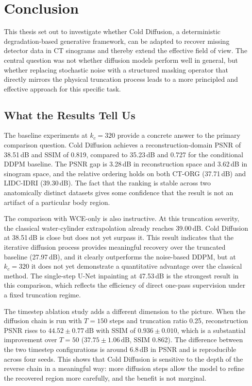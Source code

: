 \chapter{Conclusion}
\label{ch:conclusion}

This thesis set out to investigate whether Cold Diffusion, a deterministic degradation-based generative framework, can be adapted to recover missing detector data in CT sinograms and thereby extend the effective field of view. The central question was not whether diffusion models perform well in general, but whether replacing stochastic noise with a structured masking operator that directly mirrors the physical truncation process leads to a more principled and effective approach for this specific task.

\section{What the Results Tell Us}

The baseline experiments at \(k_c = 320\) provide a concrete answer to the primary comparison question. Cold Diffusion achieves a reconstruction-domain PSNR of 38.51\,dB and SSIM of 0.819, compared to 35.23\,dB and 0.727 for the conditional DDPM baseline. The PSNR gap is 3.28\,dB in reconstruction space and 3.62\,dB in sinogram space, and the relative ordering holds on both CT-ORG (37.71\,dB) and LIDC-IDRI (39.30\,dB). The fact that the ranking is stable across two anatomically distinct datasets gives some confidence that the result is not an artifact of a particular body region.

The comparison with WCE-only is also instructive. At this truncation severity, the classical water-cylinder extrapolation already reaches 39.00\,dB. Cold Diffusion at 38.51\,dB is close but does not yet surpass it. This result indicates that the iterative diffusion process provides meaningful recovery over the truncated baseline (27.97\,dB), and it clearly outperforms the noise-based DDPM, but at \(k_c = 320\) it does not yet demonstrate a quantitative advantage over the classical method. The single-step U-Net inpainting at 47.53\,dB is the strongest result in this comparison, which reflects the efficiency of direct one-pass supervision under a fixed truncation regime.

The timestep ablation study adds a different dimension to the picture. When the diffusion chain is run with \(T = 150\) steps and truncation ratio 0.25, reconstruction PSNR rises to \(44.52 \pm 0.77\,\text{dB}\) with SSIM of \(0.936 \pm 0.010\), which is a substantial improvement over \(T = 50\) (\(37.75 \pm 1.06\,\text{dB}\), SSIM 0.862). The difference between the two timestep configurations is around 6.8\,dB in PSNR and is reproducible across four seeds. This shows that Cold Diffusion is sensitive to the depth of the reverse chain in a meaningful way: more diffusion steps allow the model to refine the recovered region more carefully, and the benefit is not marginal.

